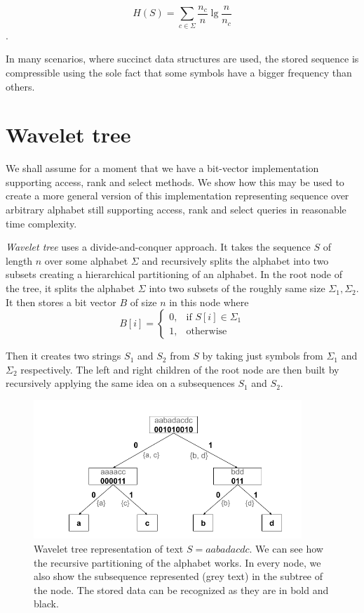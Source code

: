 $$H(S)=\sum_{c\in\Sigma} \frac{n_c}{n} \lg \frac{n}{n_c}$$.

In many scenarios, where succinct data structures are used, the stored sequence
is compressible using the sole fact that some symbols have a bigger frequency than others.

\section{Wavelet tree}
\label{section:WaweletTree}

We shall assume for a moment that we have a bit-vector implementation supporting
access, rank and select methods. We show how this may be used to create
a more general version of this implementation representing sequence over arbitrary
alphabet still supporting access, rank and select queries in reasonable time complexity.

\textit{Wavelet tree} uses a divide-and-conquer approach. It takes the sequence $S$ of
length $n$ over some alphabet $\Sigma$ and recursively splits the alphabet into
two subsets creating a hierarchical partitioning of an alphabet. In the root node
of the tree, it splits the alphabet $\Sigma$ into two subsets of the roughly same
size $\Sigma_1, \Sigma_2$. It then stores a bit vector $B$ of size $n$ in this node
where
\[
    B[i]= 
\begin{cases}
    0,& \text{if } S[i]\in \Sigma_1\\
    1,              & \text{otherwise}
\end{cases}
\]

Then it creates two strings $S_1$ and $S_2$ from $S$ by taking just symbols
from $\Sigma_1$ and $\Sigma_2$ respectively. The left and right children of the root node
are then built by recursively applying the same idea on a subsequences $S_1$ and $S_2$.

\begin{figure}
	\centerline{
		\includegraphics[width=0.9\textwidth, height=0.3\textheight]{images/wavelet_tree}
	}
	\caption[TODO]{Wavelet tree representation of text $S=aabadacdc$. We can see how the
	recursive partitioning of the alphabet works. In every node, we also show the
	subsequence represented (grey text) in the subtree of the node. The stored data can be
	recognized as they are in bold and black.
	}
	\label{obr:WaveletTreeExample}
\end{figure}

